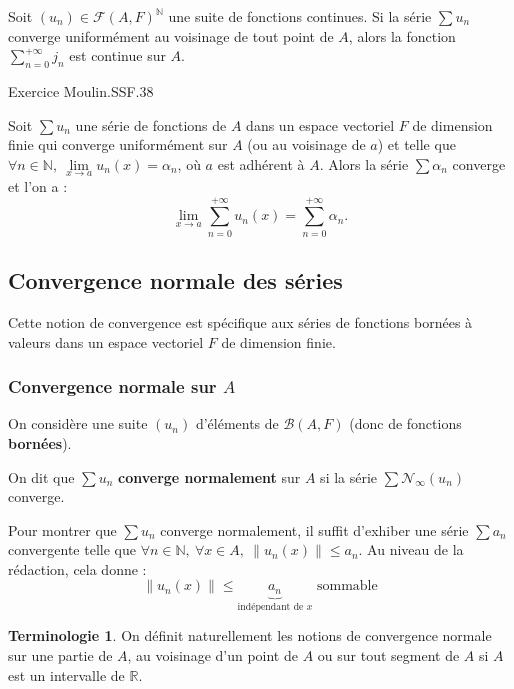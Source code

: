 \documentclass[french]{article}
\newcommand{\N}{\mathbb{N}}
\newcommand{\R}{\mathbb{R}}
\theoremstyle{plain}
\theoremstyle{definition}
\newtheorem*{terminologie}{Terminologie}
\theoremstyle{remark}
\begin{document}
\begin{cor}%
	Soit $(u_n)\in\mathcal{F}(A,F)^\N$ une suite de fonctions continues. Si la série $\displaystyle\sum u_n$ converge uniformément au voisinage de tout point de $A$, alors la fonction $\displaystyle\sum_{n=0}^{+\infty}j_n$ est continue sur $A$.
\end{cor}

Exercice Moulin.SSF.38

\begin{prop}%
	Soit $\displaystyle\sum u_n$ une série de fonctions de $A$ dans un espace vectoriel $F$ de dimension finie qui converge uniformément sur $A$ (ou au voisinage de $a$) et telle que $\forall n\in\N,\ \underset{x\to a}{\lim}u_n(x)=\alpha_n$, où $a$ est adhérent à $A$. Alors la série $\displaystyle\sum\alpha_n$ converge et l'on a :
	$$\underset{x\to a}{\lim}\sum_{n=0}^{+\infty}u_n(x)=\sum_{n=0}^{+\infty}\alpha_n.$$
\end{prop}

\subsection{Convergence normale des séries}

Cette notion de convergence est spécifique aux séries de fonctions bornées à valeurs dans un espace vectoriel $F$ de dimension finie.

\subsubsection*{Convergence normale sur $A$}

On considère une suite $(u_n)$ d'éléments de $\mathcal{B}(A,F)$ (donc de fonctions \textbf{bornées}).

\begin{dfn}
	On dit que $\displaystyle\sum u_n$ \textbf{converge normalement} sur $A$ si la série $\displaystyle\sum\mathcal{N}_\infty(u_n)$ converge.
\end{dfn}

\begin{met}
	Pour montrer que $\sum u_n$ converge normalement, il suffit d'exhiber une série $\sum a_n$ convergente telle que $\forall n\in\N,\ \forall x\in A,\ \lVert u_n(x)\rVert\leqslant a_n$. Au niveau de la rédaction, cela donne : $$\lVert u_n(x)\rVert \leqslant \underbrace{a_n}_{\text{indépendant de }x}\text{ sommable}$$
\end{met}

\begin{terminologie}
	On définit naturellement les notions de convergence normale sur une partie de $A$, au voisinage d'un point de $A$ ou sur tout segment de $A$ si $A$ est un intervalle de $\R$.
\end{terminologie}
\end{document}
